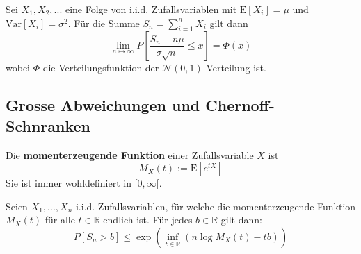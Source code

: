 \documentclass[11pt]{article}
\newcommand{\E}{\text{E}}
\newcommand{\Var}{\text{Var}}
\begin{document}
Sei $X_1, X_2, ...$ eine Folge von i.i.d. Zufallsvariablen mit $\E[X_i] = \mu$ und $\Var[X_i] = \sigma^2$. Für die Summe $S_n = \sum_{i=1}^n X_i$ gilt dann
\begin{equation*}
	\lim_{n\mapsto\infty} P[\frac{S_n - n\mu}{\sigma \sqrt{n}} \leq x] = \Phi(x)
\end{equation*}
wobei $\Phi$ die Verteilungsfunktion der $\mathcal{N}(0,1)$-Verteilung ist.

\subsection{Grosse Abweichungen und Chernoff-Schnranken}

Die \textbf{momenterzeugende Funktion} einer Zufallsvariable $X$ ist
\begin{equation*}
	M_X(t) := \E[e^{tX}]
\end{equation*}
Sie ist immer wohldefiniert in $[0, \infty[$.

Seien $X_1, ..., X_n$ i.i.d. Zufallsvariablen, für welche die momenterzeugende Funktion $M_X(t)$ für alle $t \in \mathbb{R}$ endlich ist. Für jedes $b \in \mathbb{R}$ gilt dann:
\begin{equation*}
	P[S_n > b] \leq \exp(\inf_{t \in \mathbb{R}}(n \log M_X(t) - tb))
\end{equation*}
\end{document}
